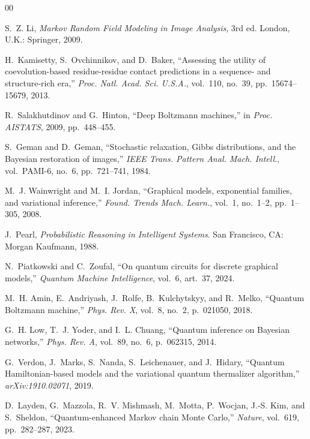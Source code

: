 \documentclass[conference,10pt]{IEEEtran}
\begin{document}
\begin{thebibliography}{00}

 S.~Z. Li, \emph{Markov Random Field Modeling in Image Analysis}, 3rd ed. London, U.K.: Springer, 2009.

 H.~Kamisetty, S.~Ovchinnikov, and D.~Baker, ``Assessing the utility of coevolution-based residue-residue contact predictions in a sequence- and structure-rich era,'' \emph{Proc. Natl. Acad. Sci. U.S.A.}, vol.~110, no.~39, pp.~15674--15679, 2013.

 R.~Salakhutdinov and G.~Hinton, ``Deep Boltzmann machines,'' in \emph{Proc. AISTATS}, 2009, pp.~448--455.

 S.~Geman and D.~Geman, ``Stochastic relaxation, Gibbs distributions, and the Bayesian restoration of images,'' \emph{IEEE Trans. Pattern Anal. Mach. Intell.}, vol.~PAMI-6, no.~6, pp.~721--741, 1984.

 M.~J. Wainwright and M.~I. Jordan, ``Graphical models, exponential families, and variational inference,'' \emph{Found. Trends Mach. Learn.}, vol.~1, no.~1--2, pp.~1--305, 2008.

 J.~Pearl, \emph{Probabilistic Reasoning in Intelligent Systems}. San Francisco, CA: Morgan Kaufmann, 1988.

 N.~Piatkowski and C.~Zoufal, ``On quantum circuits for discrete graphical models,'' \emph{Quantum Machine Intelligence}, vol.~6, art.~37, 2024.

 M.~H. Amin, E.~Andriyash, J.~Rolfe, B.~Kulchytskyy, and R.~Melko, ``Quantum Boltzmann machine,'' \emph{Phys. Rev. X}, vol.~8, no.~2, p.~021050, 2018.

 G.~H. Low, T.~J. Yoder, and I.~L. Chuang, ``Quantum inference on Bayesian networks,'' \emph{Phys. Rev. A}, vol.~89, no.~6, p.~062315, 2014.

 G.~Verdon, J.~Marks, S.~Nanda, S.~Leichenauer, and J.~Hidary, ``Quantum Hamiltonian-based models and the variational quantum thermalizer algorithm,'' \emph{arXiv:1910.02071}, 2019.

 D.~Layden, G.~Mazzola, R.~V. Mishmash, M.~Motta,
P.~Wocjan, J.-S. Kim, and S.~Sheldon, ``Quantum-enhanced Markov chain Monte
Carlo,'' \emph{Nature}, vol.~619, pp.~282--287, 2023.


\end{thebibliography}
\end{document}
